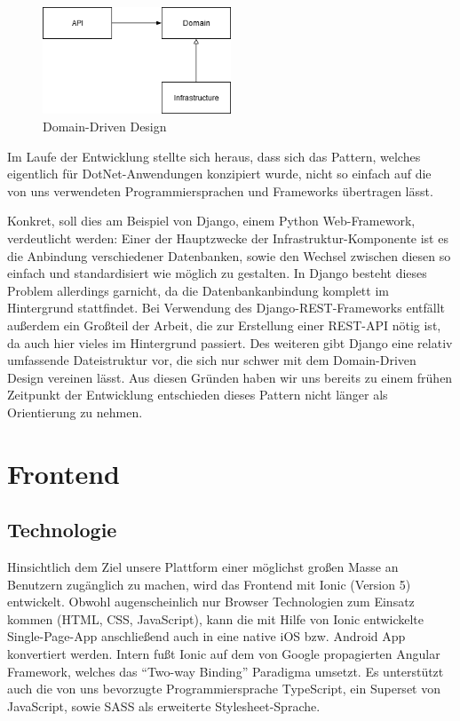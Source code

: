 \documentclass{article}
\begin{document}
\begin{figure}[htbp]
\centering
\label{fig:domaindrivendesign}
\includegraphics[width=0.5\textwidth]{images/domain-driven-design}
\caption{Domain-Driven Design}
\end{figure}

Im Laufe der Entwicklung stellte sich heraus, dass sich das Pattern, welches eigentlich für DotNet-Anwendungen konzipiert wurde, nicht so einfach auf die von uns verwendeten Programmiersprachen und Frameworks übertragen lässt. 

Konkret, soll dies am Beispiel von Django, einem Python Web-Framework, verdeutlicht werden: Einer der Hauptzwecke der Infrastruktur-Komponente ist es die Anbindung verschiedener Datenbanken, sowie den Wechsel zwischen diesen so einfach und standardisiert wie möglich zu gestalten. In Django besteht dieses Problem allerdings garnicht, da die Datenbankanbindung komplett im Hintergrund stattfindet. Bei Verwendung des Django-REST-Frameworks entfällt außerdem ein Großteil der Arbeit, die zur Erstellung einer REST-API nötig ist, da auch hier vieles im Hintergrund passiert. Des weiteren gibt Django eine relativ umfassende Dateistruktur vor, die sich nur schwer mit dem Domain-Driven Design vereinen lässt. Aus diesen Gründen haben wir uns bereits zu einem frühen Zeitpunkt der Entwicklung entschieden dieses Pattern nicht länger als Orientierung zu nehmen.


\section{Frontend} %


\subsection{Technologie}
\label{sec:frontend-tech}

Hinsichtlich dem Ziel unsere Plattform einer möglichst großen Masse an Benutzern zugänglich zu machen, wird das Frontend mit Ionic (Version 5) entwickelt. Obwohl augenscheinlich nur Browser Technologien zum Einsatz kommen (HTML, CSS, JavaScript), kann die mit Hilfe von Ionic entwickelte Single-Page-App anschließend auch in eine native iOS bzw. Android App konvertiert werden. Intern fußt Ionic auf dem von Google propagierten Angular Framework, welches das \enquote{Two-way Binding} Paradigma umsetzt. Es unterstützt auch die von uns bevorzugte Programmiersprache TypeScript, ein Superset von JavaScript, sowie SASS als erweiterte Stylesheet-Sprache. 
\end{document}
